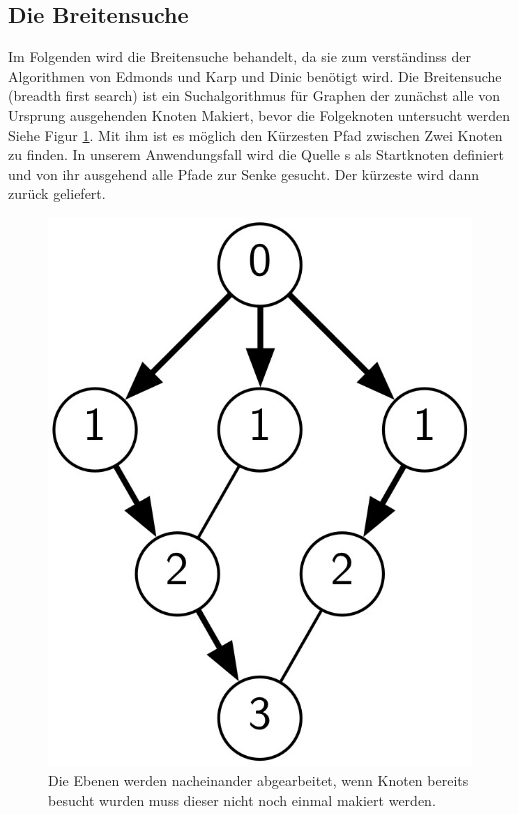 \documentclass[a4paper]{llncs}
\begin{document}
\subsection{Die Breitensuche}
\label{Breitensuche}
Im Folgenden wird die Breitensuche behandelt, da sie zum verständinss der Algorithmen von Edmonds und Karp und Dinic benötigt wird.
Die Breitensuche (breadth first search) ist ein Suchalgorithmus für Graphen der zunächst alle von Ursprung ausgehenden Knoten Makiert, bevor die Folgeknoten untersucht werden Siehe Figur \ref{fig:Graph2}.
Mit ihm ist es möglich den Kürzesten Pfad zwischen Zwei Knoten zu finden.
In unserem Anwendungsfall wird die Quelle s als Startknoten definiert und von ihr ausgehend alle Pfade zur Senke gesucht. Der kürzeste wird dann zurück geliefert.
\begin{figure}[htbp] 
  \centering
     \includegraphics[scale=0.14]{BreitensucheGraph} 
  \caption{Die Ebenen werden nacheinander abgearbeitet, wenn Knoten bereits besucht wurden muss dieser nicht noch einmal makiert werden.}
  \label{fig:Graph2}
\end{figure}
\end{document}
